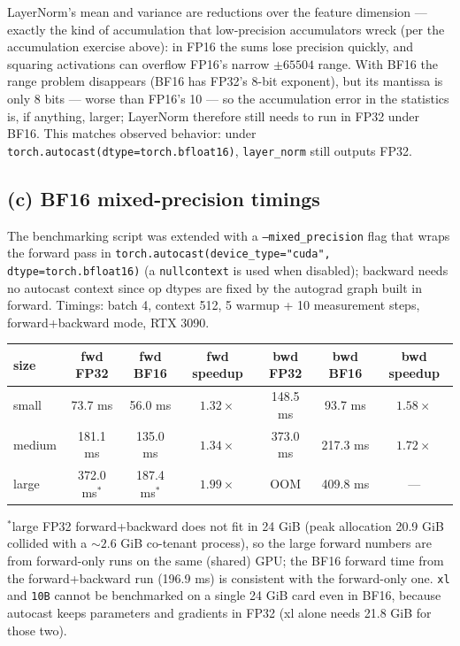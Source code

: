 \documentclass[11pt]{article}
\newcommand{\code}[1]{\texttt{#1}}
\begin{document}
LayerNorm's mean and variance are reductions over the feature dimension --- exactly the kind of
accumulation that low-precision accumulators wreck (per the accumulation exercise above): in FP16
the sums lose precision quickly, and squaring activations can overflow FP16's narrow $\pm 65504$
range. With BF16 the range problem disappears (BF16 has FP32's 8-bit exponent), but its mantissa is
only 8 bits --- worse than FP16's 10 --- so the accumulation error in the statistics is, if anything,
larger; LayerNorm therefore still needs to run in FP32 under BF16. This matches observed behavior:
under \code{torch.autocast(dtype=torch.bfloat16)}, \code{layer\_norm} still outputs FP32.

\subsection{(c) BF16 mixed-precision timings}

The benchmarking script was extended with a \code{--mixed\_precision} flag that wraps the forward
pass in \code{torch.autocast(device\_type="cuda", dtype=torch.bfloat16)} (a \code{nullcontext} is
used when disabled); backward needs no autocast context since op dtypes are fixed by the autograd
graph built in forward. Timings: batch 4, context 512, 5 warmup + 10 measurement steps,
forward+backward mode, RTX 3090.

\begin{center}
\begin{tabular}{lcccccc}
\toprule
size & fwd FP32 & fwd BF16 & fwd speedup & bwd FP32 & bwd BF16 & bwd speedup \\
\midrule
small  & 73.7 ms & 56.0 ms & $1.32\times$ & 148.5 ms & 93.7 ms & $1.58\times$ \\
medium & 181.1 ms & 135.0 ms & $1.34\times$ & 373.0 ms & 217.3 ms & $1.72\times$ \\
large  & 372.0 ms$^*$ & 187.4 ms$^*$ & $1.99\times$ & OOM & 409.8 ms & --- \\
\bottomrule
\end{tabular}
\end{center}

$^*$large FP32 forward+backward does not fit in 24 GiB (peak allocation 20.9 GiB collided with a
${\sim}2.6$ GiB co-tenant process), so the large forward numbers are from forward-only runs on the
same (shared) GPU; the BF16 forward time from the forward+backward run (196.9 ms) is consistent with
the forward-only one. \code{xl} and \code{10B} cannot be benchmarked on a single 24 GiB card even in
BF16, because autocast keeps parameters and gradients in FP32 (xl alone needs 21.8 GiB for those
two).
\end{document}
